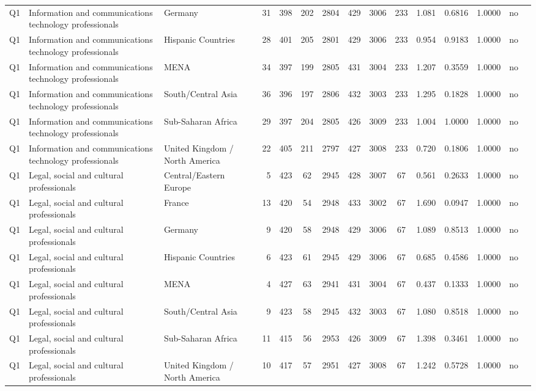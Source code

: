 \begin{longtable}{lllrcccccccccll}
Q1 & Information and communications technology professionals & Germany & 31 & 398 & 202 & 2804 & 429 & 3006 & 233 & 1.081 & 0.6816 & 1.0000 & no \\
Q1 & Information and communications technology professionals & Hispanic Countries & 28 & 401 & 205 & 2801 & 429 & 3006 & 233 & 0.954 & 0.9183 & 1.0000 & no \\
Q1 & Information and communications technology professionals & MENA & 34 & 397 & 199 & 2805 & 431 & 3004 & 233 & 1.207 & 0.3559 & 1.0000 & no \\
Q1 & Information and communications technology professionals & South/Central Asia & 36 & 396 & 197 & 2806 & 432 & 3003 & 233 & 1.295 & 0.1828 & 1.0000 & no \\
Q1 & Information and communications technology professionals & Sub-Saharan Africa & 29 & 397 & 204 & 2805 & 426 & 3009 & 233 & 1.004 & 1.0000 & 1.0000 & no \\
Q1 & Information and communications technology professionals & United Kingdom / North America & 22 & 405 & 211 & 2797 & 427 & 3008 & 233 & 0.720 & 0.1806 & 1.0000 & no \\
Q1 & Legal, social and cultural professionals & Central/Eastern Europe & 5 & 423 & 62 & 2945 & 428 & 3007 & 67 & 0.561 & 0.2633 & 1.0000 & no \\
Q1 & Legal, social and cultural professionals & France & 13 & 420 & 54 & 2948 & 433 & 3002 & 67 & 1.690 & 0.0947 & 1.0000 & no \\
Q1 & Legal, social and cultural professionals & Germany & 9 & 420 & 58 & 2948 & 429 & 3006 & 67 & 1.089 & 0.8513 & 1.0000 & no \\
Q1 & Legal, social and cultural professionals & Hispanic Countries & 6 & 423 & 61 & 2945 & 429 & 3006 & 67 & 0.685 & 0.4586 & 1.0000 & no \\
Q1 & Legal, social and cultural professionals & MENA & 4 & 427 & 63 & 2941 & 431 & 3004 & 67 & 0.437 & 0.1333 & 1.0000 & no \\
Q1 & Legal, social and cultural professionals & South/Central Asia & 9 & 423 & 58 & 2945 & 432 & 3003 & 67 & 1.080 & 0.8518 & 1.0000 & no \\
Q1 & Legal, social and cultural professionals & Sub-Saharan Africa & 11 & 415 & 56 & 2953 & 426 & 3009 & 67 & 1.398 & 0.3461 & 1.0000 & no \\
Q1 & Legal, social and cultural professionals & United Kingdom / North America & 10 & 417 & 57 & 2951 & 427 & 3008 & 67 & 1.242 & 0.5728 & 1.0000 & no \\

\end{longtable}
